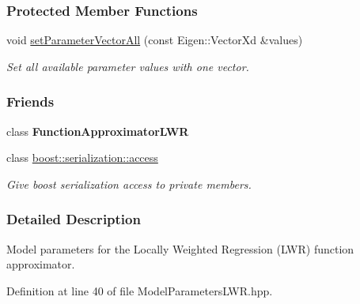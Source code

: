 \subsubsection*{Protected Member Functions}
\begin{DoxyCompactItemize}
\item 
void \hyperlink{classDmpBbo_1_1ModelParametersLWR_a9d3c8f22e8237a805af4935a647e5a50}{set\+Parameter\+Vector\+All} (const Eigen\+::\+Vector\+Xd \&values)
\begin{DoxyCompactList}\small\item\em Set all available parameter values with one vector. \end{DoxyCompactList}\end{DoxyCompactItemize}
\subsubsection*{Friends}
\begin{DoxyCompactItemize}
\item 
\hypertarget{classDmpBbo_1_1ModelParametersLWR_ac0d40e39a36fa48c89fcf37f518af0cd}{class {\bfseries Function\+Approximator\+L\+W\+R}}\label{classDmpBbo_1_1ModelParametersLWR_ac0d40e39a36fa48c89fcf37f518af0cd}

\item 
class \hyperlink{classDmpBbo_1_1ModelParametersLWR_ac98d07dd8f7b70e16ccb9a01abf56b9c}{boost\+::serialization\+::access}
\begin{DoxyCompactList}\small\item\em Give boost serialization access to private members. \end{DoxyCompactList}\end{DoxyCompactItemize}


\subsubsection{Detailed Description}
Model parameters for the Locally Weighted Regression (L\+W\+R) function approximator. 

Definition at line 40 of file Model\+Parameters\+L\+W\+R.\+hpp.




